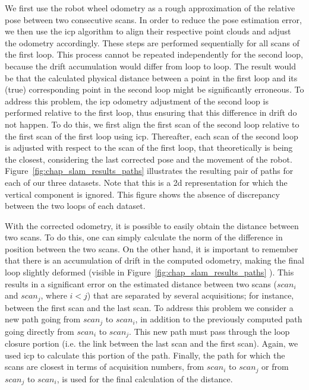 We first use the robot wheel odometry as a rough approximation of the relative pose between two consecutive scans. In order to reduce the pose estimation error, we then use the \gls*{icp} algorithm to align their respective point clouds and adjust the odometry accordingly. These steps are performed sequentially for all scans of the first loop. This process cannot be repeated independently for the second loop, because the drift accumulation would differ from loop to loop. The result would be that the calculated physical distance between a point in the first loop and its (true) corresponding point in the second loop might be significantly erroneous. To address this problem, the \gls*{icp} odometry adjustment of the second loop is performed relative to the first loop, thus ensuring that this difference in drift do not happen. To do this, we first align the first scan of the second loop relative to the first scan of the first loop using \gls*{icp}. Thereafter, each scan of the second loop is adjusted with respect to the scan of the first loop, that theoretically is being the closest, considering the last corrected pose and the movement of the robot. Figure~\ref{fig:chap_slam_results_paths} illustrates the resulting pair of paths for each of our three datasets. Note that this is a \gls*{2d} representation for which the vertical component is ignored. This figure shows the absence of discrepancy between the two loops of each dataset.

With the corrected odometry, it is possible to easily obtain the distance between two scans. To do this, one can simply calculate the norm of the difference in position between the two scans. On the other hand, it is important to remember that there is an accumulation of drift in the computed odometry, making the final loop slightly deformed (visible in Figure~\ref{fig:chap_slam_results_paths} \protect{} \protect{}). This results in a significant error on the estimated distance between two scans ($scan_i$ and $scan_j$, where $i<j$) that are separated by several acquisitions; for instance, between the first scan and the last scan. To address this problem we consider a new path going from $scan_j$ to $scan_i$, in addition to the previously computed path going directly from $scan_i$ to $scan_j$. This new path must pass through the loop closure portion (i.e. the link between the last scan and the first scan). Again, we used \gls*{icp} to calculate this portion of the path. Finally, the path for which the scans are closest in terms of acquisition numbers, from $scan_i$ to $scan_j$ or from $scan_j$ to $scan_i$, is used for the final calculation of the distance.

